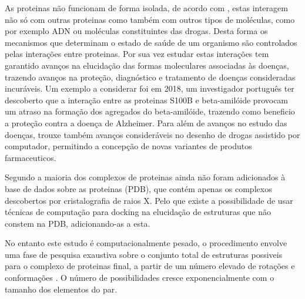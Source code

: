 As proteinas não funcionam de forma isolada, de acordo com \cite{gonzalez2012protein}, estas interagem não só com outras proteinas como também com outros tipos de moléculas, como por exemplo ADN ou moléculas constituintes das drogas. Desta forma os mecanismos que determinam o estado de saúde de um organismo são controlados pelas interações entre proteinas. 
Por sua vez estudar estas interações tem garantido avanços na elucidação das formas moleculares associadas às doenças, trazendo avanços na proteção, diagnóstico e tratamento de doenças consideradas incuráveis. Um exemplo a considerar foi em 2018, um investigador português ter descoberto que a interação entre as proteinas S100B e beta-amilóide provocam um atraso na formação dos agregados do beta-amilóide, trazendo como beneficio a proteção contra a doença de Alzheimer\cite{noticia}. Para além de avanços no estudo das doenças, trouxe também avanços consideráveis no desenho de drogas assistido por computador, permitindo a concepção de novas variantes de produtos farmaceuticos.\par
Segundo \cite{ZDOCKaccelerating} a maioria dos complexos de proteinas ainda não foram adicionados à base de dados sobre as proteinas (PDB), que contém apenas os complexos descobertos por cristalografia de raios X. Pelo que existe a possibilidade de usar técnicas de computação para docking na elucidação de estruturas que não constem na PDB, adicionando-as a esta.\par
No entanto este estudo é computacionalmente pesado, o procedimento envolve uma fase de pesquisa exaustiva sobre o conjunto total de estruturas possiveis para o complexo de proteinas final, a partir de um número elevado de rotações e conformações . O número de possibilidades cresce exponencialmente com o tamanho dos elementos do par\cite{halperin}.%
